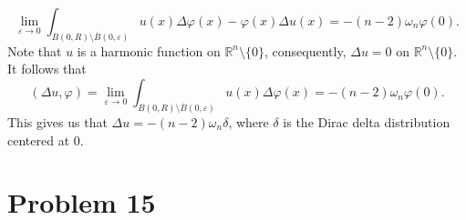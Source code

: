 \documentclass[10pt]{amsart}
\theoremstyle{thmstyle}
\theoremstyle{defstyle}
\newcommand{\R}{\mathbb{R}}
\begin{document}
\begin{equation*}
	\lim_{\varepsilon\to 0}\int_{B(0, R)\setminus\overline B(0,\varepsilon)}u(x)\Delta\varphi(x) - \varphi(x)\Delta u(x) = - (n - 2)\omega_n\varphi(0).
\end{equation*}
Note that $u$ is a harmonic function on $\R^n\setminus\{0\}$, consequently, $\Delta u = 0$ on $\R^n\setminus\{0\}$. It follows that 
\begin{equation*}
	(\Delta u,\varphi) = \lim_{\varepsilon\to 0}\int_{B(0, R)\setminus\overline B(0,\varepsilon)}u(x)\Delta\varphi(x) = - (n - 2)\omega_n\varphi(0).
\end{equation*}
This gives us that $\Delta u = -(n - 2)\omega_n\delta$, where $\delta$ is the Dirac delta distribution centered at $0$.

\section{Problem 15}
\end{document}
